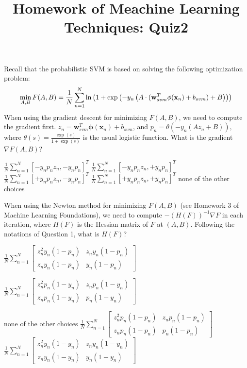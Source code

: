 \documentclass[a4paper,10pt]{exam}
\title{Homework of Meachine Learning Techniques: Quiz2}
\date{}
\author{}
\begin{document}
\maketitle
\begin{questions}
	\question Recall that the probabilistic SVM is based on solving the following optimization problem:
\[\mathop {\min }\limits_{A,B} F(A,B) = \frac{1}{N}\sum\limits_{n = 1}^N {\ln } \left( {1 + \exp \left( { - {y_n}\left( {A \cdot ({\bf{w}}_{svm}^T\phi ({{\bf{x}}_n}) + {b_{svm}}) + B} \right)} \right)} \right)\]
	When using the gradient descent for minimizing $F(A,B)$, we need to compute the gradient first. $z_n = \mathbf{w}_{svm}^T   \mathbf{\phi}(\mathbf{x}_n)+b_{svm}$, and $p_n = \theta(-y_n( A z_n + B))$, where $\theta(s) = \frac{\exp(s)}{1+\exp(s)}$ is the usual logistic function. What is the gradient $\nabla F(A,B)$?
	\begin{checkboxes}
    	\CorrectChoice $\frac{1}{N}\sum_{n=1}^N [-y_np_nz_n, -y_np_n ]^T$
		\choice $\frac{1}{N}\sum_{n=1}^N [ -y_np_nz_n, +y_np_n ]^T$
		\choice $\frac{1}{N}\sum_{n=1}^N [ +y_np_nz_n, -y_np_n ]^T$
		\choice $\frac{1}{N}\sum_{n=1}^N [ +y_np_nz_n, +y_np_n ]^T$
		\choice none of the other choices\\
	\end{checkboxes}
	
	\question When using the Newton method for minimizing $F(A,B)$ (see Homework 3 of Machine Learning Foundations), we need to compute $-(H(F))^{-1    }\nabla F $ in each iteration, where $H(F)$ is the Hessian matrix of $F$ at $(A,B)$. Following the notations of Question 1, what is $H(F)$?
	\begin{checkboxes}
		\choice 	$\frac{1}{N}\sum\limits_{n = 1}^N {\left[ {\begin{array}{*{20}{c}}
				{z_n^2{y_n}(1 - {p_n})}&{{z_n}{y_n}(1 - {p_n})}\\
				{{z_n}{y_n}(1 - {p_n})}&{{y_n}(1 - {p_n})}
				\end{array}} \right]} $
		
		\choice  $\frac{1}{N}\sum\limits_{n = 1}^N {\left[ {\begin{array}{*{20}{c}}
				{z_n^2{p_n}(1 - {y_n})}&{{z_n}{p_n}(1 - {y_n})}\\
				{{z_n}{p_n}(1 - {y_n})}&{{p_n}(1 - {y_n})}
				\end{array}} \right]} $
		
		\choice none of the other choices
		\CorrectChoice $\frac{1}{N}\sum\limits_{n = 1}^N {\left[ {\begin{array}{*{20}{c}}
				{z_n^2{p_n}(1 - {p_n})}&{{z_n}{p_n}(1 - {p_n})}\\
				{{z_n}{p_n}(1 - {p_n})}&{{p_n}(1 - {p_n})}
				\end{array}} \right]} $
		\choice $\frac{1}{N}\sum\limits_{n = 1}^N {\left[ {\begin{array}{*{20}{c}}
				{z_n^2{y_n}(1 - {y_n})}&{{z_n}{y_n}(1 - {y_n})}\\
				{{z_n}{y_n}(1 - {y_n})}&{{y_n}(1 - {y_n})}
				\end{array}} \right]} $\\
	\end{checkboxes}
	

\end{questions}
\end{document}
